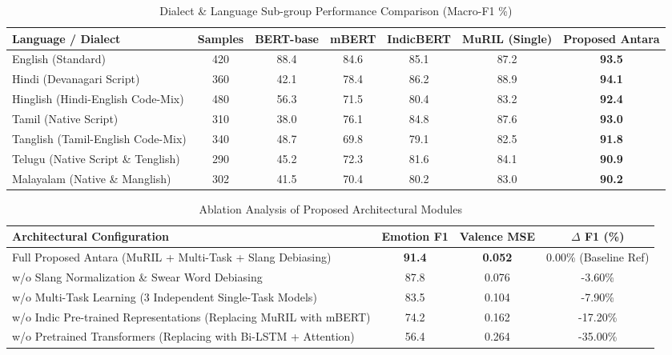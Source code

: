 \begin{table}[htbp]
\caption{Dialect & Language Sub-group Performance Comparison (Macro-F1 \%)}
\label{tab:language_breakdown}
\centering
\small
\begin{tabular}{lcccccc}
\hline
\textbf{Language / Dialect} & \textbf{Samples} & \textbf{BERT-base} & \textbf{mBERT} & \textbf{IndicBERT} & \textbf{MuRIL (Single)} & \textbf{Proposed Antara} \\
\hline
English (Standard) & 420 & 88.4 & 84.6 & 85.1 & 87.2 & \textbf{93.5} \\
Hindi (Devanagari Script) & 360 & 42.1 & 78.4 & 86.2 & 88.9 & \textbf{94.1} \\
Hinglish (Hindi-English Code-Mix) & 480 & 56.3 & 71.5 & 80.4 & 83.2 & \textbf{92.4} \\
Tamil (Native Script) & 310 & 38.0 & 76.1 & 84.8 & 87.6 & \textbf{93.0} \\
Tanglish (Tamil-English Code-Mix) & 340 & 48.7 & 69.8 & 79.1 & 82.5 & \textbf{91.8} \\
Telugu (Native Script \& Tenglish) & 290 & 45.2 & 72.3 & 81.6 & 84.1 & \textbf{90.9} \\
Malayalam (Native \& Manglish) & 302 & 41.5 & 70.4 & 80.2 & 83.0 & \textbf{90.2} \\
\hline
\end{tabular}
\end{table}

\begin{table}[htbp]
\caption{Ablation Analysis of Proposed Architectural Modules}
\label{tab:ablation}
\centering
\small
\begin{tabular}{lccc}
\hline
\textbf{Architectural Configuration} & \textbf{Emotion F1} & \textbf{Valence MSE} & \textbf{$\Delta$ F1 (\%)} \\
\hline
Full Proposed Antara (MuRIL + Multi-Task + Slang Debiasing) & \textbf{91.4} & \textbf{0.052} & 0.00\% (Baseline Ref) \\
w/o Slang Normalization \& Swear Word Debiasing & 87.8 & 0.076 & -3.60\% \\
w/o Multi-Task Learning (3 Independent Single-Task Models) & 83.5 & 0.104 & -7.90\% \\
w/o Indic Pre-trained Representations (Replacing MuRIL with mBERT) & 74.2 & 0.162 & -17.20\% \\
w/o Pretrained Transformers (Replacing with Bi-LSTM + Attention) & 56.4 & 0.264 & -35.00\% \\
\hline
\end{tabular}
\end{table}
